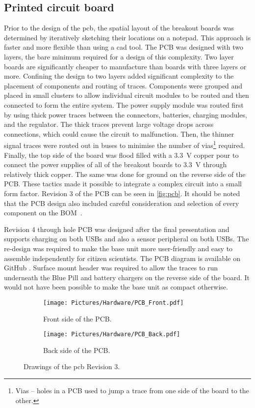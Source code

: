 \subsection{Printed circuit board}

Prior to the design of the \gls{pcb}, the spatial layout of the breakout boards was determined by iteratively sketching their locations on a notepad. This approach is faster and more flexible than using a \gls{cad} tool. The PCB was designed with two layers, the bare minimum required for a design of this complexity. Two layer boards are significantly cheaper to manufacture than boards with three layers or more. Confining the design to two layers added significant complexity to the placement of components and routing of traces. Components were grouped and placed in small clusters to allow individual circuit modules to be routed and then connected to form the entire system. The power supply module was routed first by using thick power traces between the connectors, batteries, charging modules, and the regulator. The thick traces prevent large voltage drops across connections, which could cause the circuit to malfunction. Then, the thinner signal traces were routed out in buses to minimise the number of vias\footnote{Vias -- holes in a PCB used to jump a trace from one side of the board to the other.} required. Finally, the top side of the board was flood filled with a \SI{3.3}{V} copper pour to connect the power supplies of all of the breakout boards to \SI{3.3}{V} through relatively thick copper. The same was done for ground on the reverse side of the PCB. These tactics made it possible to integrate a complex circuit into a small form factor. Revision 3 of the PCB can be seen in \cref{fig:pcb}. It should be noted that the PCB design also included careful consideration and selection of every component on the \gls{BOM}~\cite{JM_BOM}.

Revision 4 through hole PCB was designed after the final presentation and supports charging on both \gls{USB}s and also a sensor peripheral on both \gls{USB}s. The re-design was required to make the base unit more user-friendly and easy to assemble independently for citizen scientists. The PCB diagram is available on GitHub \cite{JM_PCB}. Surface mount header was required to allow the traces to run underneath the Blue Pill and battery chargers on the reverse side of the board. It would not have been possible to make the base unit as compact otherwise.


\begin{figure}
\centering
	\begin{subfigure}[b]{0.48\linewidth}
		\centering
		\texttt{[image: Pictures/Hardware/PCB\_Front.pdf]}
		\captionsetup{justification = centering}
		\caption{Front side of the PCB.}
		\label{fig:JM_PCB_Front}
	\end{subfigure}
	\begin{subfigure}[b]{0.48\linewidth}
		\centering
		\texttt{[image: Pictures/Hardware/PCB\_Back.pdf]}
		\captionsetup{justification = centering}
		\caption{Back side of the PCB.}
		\label{fig:JM_PCB_Back}
	\end{subfigure}
\caption{Drawings of the \gls{pcb} Revision 3.}
\end{figure}


